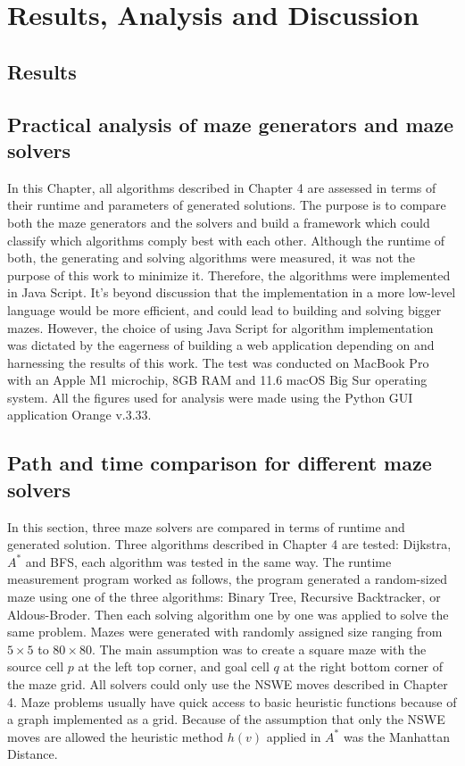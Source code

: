 \chapter{Results, Analysis and Discussion}\label{cha:Results Analysis and Discussion}
\section{Results}
\section{Practical analysis of maze generators and maze solvers}
In this Chapter, all algorithms described in Chapter 4 are assessed in terms of their runtime and parameters of generated solutions. The purpose is to compare 
both the maze generators and the solvers and build a framework which could classify which algorithms comply best with each other. Although the runtime of both, the generating
and solving algorithms were measured, it was not the purpose of this work to minimize it. Therefore, the algorithms were implemented in Java Script. It's beyond 
discussion that the implementation in a more low-level language would be more efficient, and could lead to building and solving bigger mazes. However, the choice of using
Java Script for algorithm implementation was dictated by the eagerness of building a web application depending on and harnessing the results of this work. The test was conducted 
on MacBook Pro with an Apple M1 microchip, 8GB RAM and 11.6 macOS Big Sur operating system. All the figures used for analysis were made using the Python GUI application Orange v.3.33.
\section{Path and time comparison for different maze solvers}
In this section, three maze solvers are compared in terms of runtime and generated solution. Three algorithms described in Chapter 4 are tested:
Dijkstra, $A^*$ and BFS, each algorithm was tested in the same way. The runtime measurement program worked as follows, the program generated a random-sized maze using one of the three algorithms:
Binary Tree, Recursive Backtracker, or Aldous-Broder. Then each solving algorithm one by one was applied to solve the same problem. Mazes were generated with randomly assigned
size ranging from $5 \times 5$ to $80 \times 80$. The main assumption was to create a square maze with the source cell $p$ at the left top corner, and goal cell $q$ at the right bottom corner of the maze grid. 
All solvers could only use the NSWE moves described in Chapter 4. Maze problems usually have quick access to basic heuristic functions because of a graph implemented as a grid. 
Because of the assumption that only the NSWE moves are allowed the heuristic method $h(v)$ applied in $A^*$ was the Manhattan Distance. 
